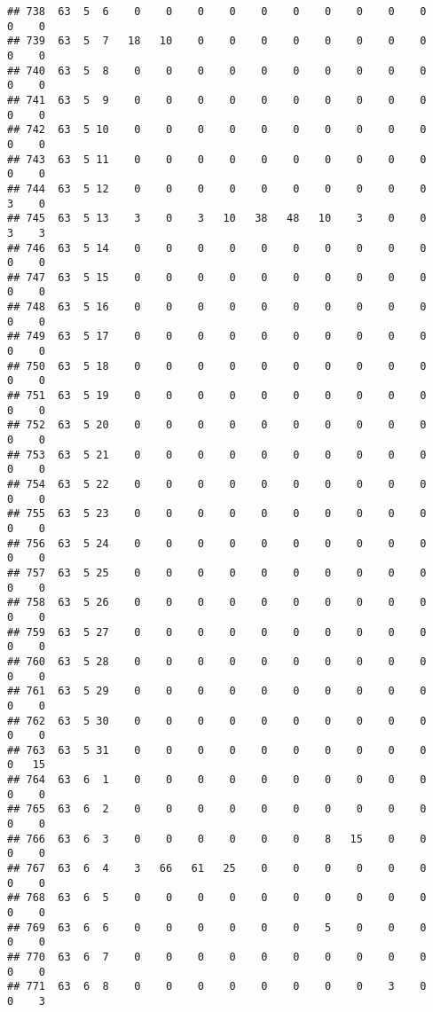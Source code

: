 \documentclass[]{article}
\begin{document}
\begin{verbatim}
## 738  63  5  6    0    0    0    0    0    0    0    0    0    0    0    0
## 739  63  5  7   18   10    0    0    0    0    0    0    0    0    0    0
## 740  63  5  8    0    0    0    0    0    0    0    0    0    0    0    0
## 741  63  5  9    0    0    0    0    0    0    0    0    0    0    0    0
## 742  63  5 10    0    0    0    0    0    0    0    0    0    0    0    0
## 743  63  5 11    0    0    0    0    0    0    0    0    0    0    0    0
## 744  63  5 12    0    0    0    0    0    0    0    0    0    0    3    0
## 745  63  5 13    3    0    3   10   38   48   10    3    0    0    3    3
## 746  63  5 14    0    0    0    0    0    0    0    0    0    0    0    0
## 747  63  5 15    0    0    0    0    0    0    0    0    0    0    0    0
## 748  63  5 16    0    0    0    0    0    0    0    0    0    0    0    0
## 749  63  5 17    0    0    0    0    0    0    0    0    0    0    0    0
## 750  63  5 18    0    0    0    0    0    0    0    0    0    0    0    0
## 751  63  5 19    0    0    0    0    0    0    0    0    0    0    0    0
## 752  63  5 20    0    0    0    0    0    0    0    0    0    0    0    0
## 753  63  5 21    0    0    0    0    0    0    0    0    0    0    0    0
## 754  63  5 22    0    0    0    0    0    0    0    0    0    0    0    0
## 755  63  5 23    0    0    0    0    0    0    0    0    0    0    0    0
## 756  63  5 24    0    0    0    0    0    0    0    0    0    0    0    0
## 757  63  5 25    0    0    0    0    0    0    0    0    0    0    0    0
## 758  63  5 26    0    0    0    0    0    0    0    0    0    0    0    0
## 759  63  5 27    0    0    0    0    0    0    0    0    0    0    0    0
## 760  63  5 28    0    0    0    0    0    0    0    0    0    0    0    0
## 761  63  5 29    0    0    0    0    0    0    0    0    0    0    0    0
## 762  63  5 30    0    0    0    0    0    0    0    0    0    0    0    0
## 763  63  5 31    0    0    0    0    0    0    0    0    0    0    0   15
## 764  63  6  1    0    0    0    0    0    0    0    0    0    0    0    0
## 765  63  6  2    0    0    0    0    0    0    0    0    0    0    0    0
## 766  63  6  3    0    0    0    0    0    0    8   15    0    0    0    0
## 767  63  6  4    3   66   61   25    0    0    0    0    0    0    0    0
## 768  63  6  5    0    0    0    0    0    0    0    0    0    0    0    0
## 769  63  6  6    0    0    0    0    0    0    5    0    0    0    0    0
## 770  63  6  7    0    0    0    0    0    0    0    0    0    0    0    0
## 771  63  6  8    0    0    0    0    0    0    0    0    3    0    0    3

\end{verbatim}
\end{document}
